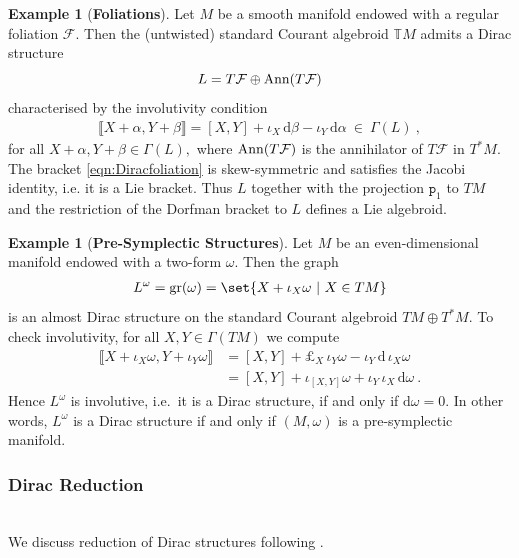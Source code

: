 \documentclass[a4paper, reqno, 11pt]{amsart}
\numberwithin{equation}{section}
\theoremstyle{definition}
\newtheorem{example}[equation]{Example}
\newcommand{\de}{\mathrm{d}}
\newcommand{\rmp}{\mathtt{p}}
\newcommand{\IT}{\mathbb{T}}
\newcommand{\cF}{{\mathcal F}}
\newcommand{\gr}{\text{gr}}
\theoremstyle{remark}
\begin{document}
\begin{example}[\textbf{Foliations}]
Let $M$ be a smooth manifold endowed with a regular foliation $\cF.$ Then the (untwisted) standard Courant algebroid $\IT M$ admits a Dirac structure $$L= T\cF \oplus {\rm Ann}(T\cF)$$ characterised by the involutivity condition
\begin{align} \label{eqn:Diracfoliation}
    \llbracket X + \alpha , Y + \beta \rrbracket = [X,Y] +\iota_X\, \de \beta - \iota_Y\, \de \alpha \ \in \ \mathsf{\Gamma}(L) \ ,
\end{align}
for all $X + \alpha, Y + \beta \in \mathsf{\Gamma}(L),$ where ${\rm Ann}(T\cF)$ is the annihilator of $T\cF$ in $T^*M$. The bracket \eqref{eqn:Diracfoliation} is skew-symmetric and satisfies the Jacobi identity, i.e. it is a Lie bracket. Thus $L$ together with the projection $\rmp_1$ to $TM$ and the restriction of the Dorfman bracket to $L$ defines a Lie algebroid.
\end{example}

\begin{example}[\textbf{Pre-Symplectic Structures}] \label{eg:symplecticDirac}
Let $M$ be an even-dimensional manifold endowed with a two-form $\omega.$ Then the graph
\begin{align}
    L^\omega = \gr(\omega) = \set{X + \iota_X\omega \ \vert \ X \in TM}
\end{align}
is an almost Dirac structure on the standard Courant algebroid $TM \oplus T^*M$. 
To check involutivity, for all $X, Y \in \mathsf{\Gamma}(TM)$ we compute
\begin{align}
  \llbracket X + \iota_X  \omega , Y + \iota_Y \omega \rrbracket &= [X,Y] +\pounds_X \, \iota_Y \omega - \iota_Y\, \de\, \iota_X \omega  \\[4pt]
  &= [X,Y] + \iota_{[X,Y] }\omega + \iota_Y\, \iota_X \, \de \omega \ .
\end{align}
Hence $L^\omega$ is  involutive, i.e.~it is a Dirac structure, if and only if $\de \omega = 0.$ In other words, $L^\omega$ is a Dirac structure if and only if $(M, \omega)$ is a pre-symplectic manifold.     
\end{example}

\medskip

\subsubsection{Dirac Reduction}~\\[5pt] \label{subsect:DiracReduction}
We discuss reduction of Dirac structures following \cite[Proposition~4.1]{Zambon2008reduction}. 
\end{document}
